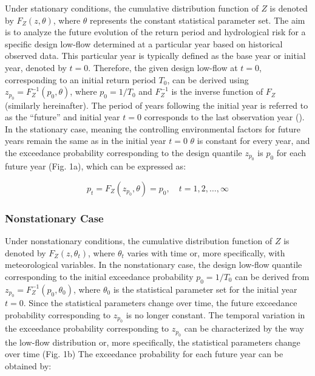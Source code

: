 \documentclass[
]{krantz}
\begin{document}
Under stationary conditions, the cumulative distribution function of \(Z\) is denoted by \(F_{Z}(z, {\theta})\), where \({\theta}\) represents the constant statistical parameter set. The aim is to analyze the future evolution of the return period and hydrological risk for a specific design low-flow determined at a particular year based on historical observed data. This particular year is typically defined as the base year or initial year, denoted by \(t=0\). Therefore, the given design low-flow at \(t=0\), corresponding to an initial return period \(T_{0}\), can be derived using \(z_{p_{0}} = F_{Z}^{-1}\left(p_{0}, \theta \right)\), where \(p_{0}=1 / T_{0}\) and \(F_{Z}^{-1}\) is the inverse function of \(F_{Z}\) (similarly hereinafter). The period of years following the initial year is referred to as the ``future'' and initial year \(t=0\) corresponds to the last observation year (\citet{Cooley2013}). In the stationary case, meaning the controlling environmental factors for future years remain the same as in the initial year \(t=0\) \(\theta\) is constant for every year, and the exceedance probability corresponding to the design quantile \(z_{p_{0}}\) is \(p_{0}\) for each future year (Fig. 1a), which can be expressed as:

\[
p_{t}=F_{Z}\left(z_{p_{0}}, {\theta}\right)=p_{0}, \quad t=1,2, \ldots, \infty \tag{4}
\]

\subsubsection{Nonstationary Case}\label{nonstationary-case}

Under nonstationary conditions, the cumulative distribution function of \(Z\) is denoted by \(F_{Z}\left(z, {\theta}_{t}\right)\), where \({\theta}_{t}\) varies with time or, more specifically, with meteorological variables. In the nonstationary case, the design low-flow quantile corresponding to the initial exceedance probability \(p_{0}=1 / T_{0}\) can be derived from \(z_{p_{0}}=F_{Z}^{-1}\left(p_{0}, {\theta}_{0}\right)\), where \({\theta}_{0}\) is the statistical parameter set for the initial year \(t=0\). Since the statistical parameters change over time, the future exceedance probability corresponding to \(z_{p_{0}}\) is no longer constant. The temporal variation in the exceedance probability corresponding to \(z_{p_{0}}\) can be characterized by the way the low-flow distribution or, more specifically, the statistical parameters change over time (Fig. 1b) The exceedance probability for each future year can be obtained by:
\end{document}
